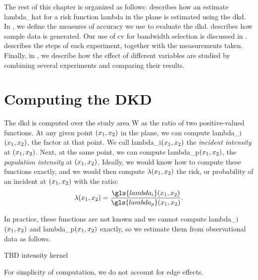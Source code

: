 The rest of this chapter is organized as follows:
 describes how an estimate \gls{lambda_hat} for a risk function \gls{lambda} in the plane is estimated using the \gls{dkd}.
In , we define the measures of accuracy we use to evaluate the \gls{dkd}.
 describes how sample data is generated.
Our use of \gls{cv} for bandwidth selection is discussed in  .
 describes the steps of each experiment, together with the measurements taken.
Finally, in , we describe how the effect of different variables are studied by combining several experiments and comparing their results.

\section{Computing the DKD}
\label{sec:method:computing}

The \gls{dkd} is computed over the study area \gls{W} as the ratio of two positive-valued functions.
At any given point $(x_1, x_2)$ in the plane, we can compute \gls{lambda_i}$(x_1, x_2)$, the \gls{factor} at that point.
We call \gls{lambda_i}$(x_1, x_2)$ the \textit{incident intensity} at $(x_1, x_2)$.
Next, at the same point, we can compute \gls{lambda_p}$(x_1, x_2)$, the \textit{population intensity} at $(x_1, x_2)$.
Ideally, we would know how to compute these functions exactly, and we would then compute $\lambda(x_1, x_2)$ the risk,
or probability of an incident at $(x_1, x_2)$ with the ratio:
\begin{equation}
    \lambda\xvec = \frac{\gls{lambda_i}\xvec}{\gls{lambda_p}\xvec}.
\end{equation}

In practice, these functions are not known and we cannot compute \gls{lambda_i}$(x_1, x_2)$ and \gls{lambda_p}$(x_1, x_2)$ exactly, 
so we estimate them from observational data as follows.

TBD intensity kernel

For simplicity of computation, we do not account for edge effects.


